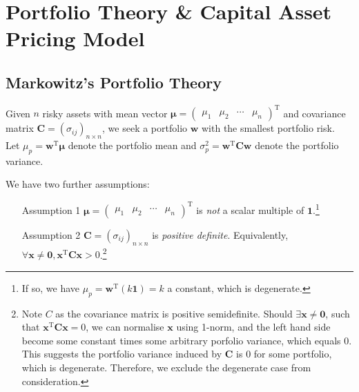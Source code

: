 \documentclass[12pt]{article}
\theoremstyle{definition}
\begin{document}
\section{Portfolio Theory \& Capital Asset Pricing Model}
\subsection{Markowitz's Portfolio Theory}
Given $n$ risky assets with mean vector $\bm{\mu}=\begin{pmatrix}\mu_1&\mu_2&\cdots&\mu_n\end{pmatrix}^\text{T}$ and covariance matrix $\mathbf{C}=(\sigma_{ij})_{n\times n}$, we seek a portfolio $\mathbf{w}$ with the smallest portfolio risk.\\Let $\mu_p =\mathbf{w}^\text{T}\bm{\mu}$ denote the portfolio mean and $\sigma_p^2 = \mathbf{w}^\text{T}\mathbf{Cw}$ denote the portfolio variance.

We have two further assumptions:
\begin{enumerate}
\item[Assumption 1] $\bm{\mu} = \begin{pmatrix}\mu_1&\mu_2&\cdots&\mu_n\end{pmatrix}^\text{T}$ is \textit{not} a scalar multiple of $\mathbf{1}$.\footnote{If so, we have $\mu_p = \mathbf{w}^\text{T}(k\mathbf{1})=k$ a constant, which is degenerate.}
\item[Assumption 2] $\mathbf{C} = (\sigma_{ij})_{n\times n}$ is \textit{positive definite}. Equivalently, $\forall \mathbf{x}\neq \mathbf{0}, \mathbf{x}^\text{T}\mathbf{Cx}>0$.\footnote{Note $C$ as the covariance matrix is positive semidefinite. Should $\exists \mathbf{x}\neq \mathbf{0}$, such that $\mathbf{x}^\text{T}\mathbf{Cx}=0$, we can normalise $\mathbf{x}$ using 1-norm, and the left hand side become some constant times some arbitrary porfolio variance, which equals 0. This suggests the portfolio variance induced by $\mathbf{C}$ is 0 for some portfolio, which is degenerate. Therefore, we exclude the degenerate case from consideration.}
\end{enumerate}
\end{document}
